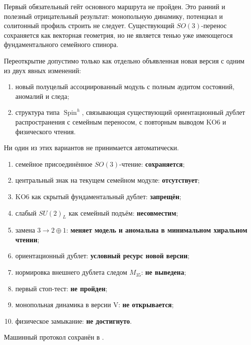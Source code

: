 Первый обязательный гейт основного маршрута не пройден. Это ранний и
полезный отрицательный результат: монопольную динамику, потенциал и
солитонный профиль строить не следует. Существующий $SO(3)$-перенос
сохраняется как векторная геометрия, но не является тенью уже имеющегося
фундаментального семейного спинора.

Переоткрытие допустимо только как отдельно объявленная новая версия с
одним из двух явных изменений:
\begin{enumerate}
 \item новый полуцелый ассоциированный модуль с полным аудитом состояний,
 аномалий и следа;
 \item структура типа $\operatorname{Spin}^h$, связывающая существующий
 ориентационный дублет распространения с семейным переносом, с повторным
 выводом KO6 и физического чтения.
\end{enumerate}
Ни один из этих вариантов не принимается автоматически.

\begin{protocol}
\begin{enumerate}
 \item семейное присоединённое $SO(3)$-чтение: \textbf{сохраняется};
 \item центральный знак на текущем семейном модуле: \textbf{отсутствует};
 \item KO6 как скрытый фундаментальный дублет: \textbf{запрещён};
 \item слабый $SU(2)_L$ как семейный подъём: \textbf{несовместим};
 \item замена $3\to2\oplus1$: \textbf{меняет модель и аномальна в
 минимальном хиральном чтении};
 \item ориентационный дублет: \textbf{условный ресурс новой версии};
 \item нормировка внешнего дублета следом $M_{35}$: \textbf{не выведена};
 \item первый стоп-тест: \textbf{не пройден};
 \item монопольная динамика в версии V: \textbf{не открывается};
 \item физическое замыкание: \textbf{не достигнуто}.
\end{enumerate}
\end{protocol}

Машинный протокол сохранён в
.